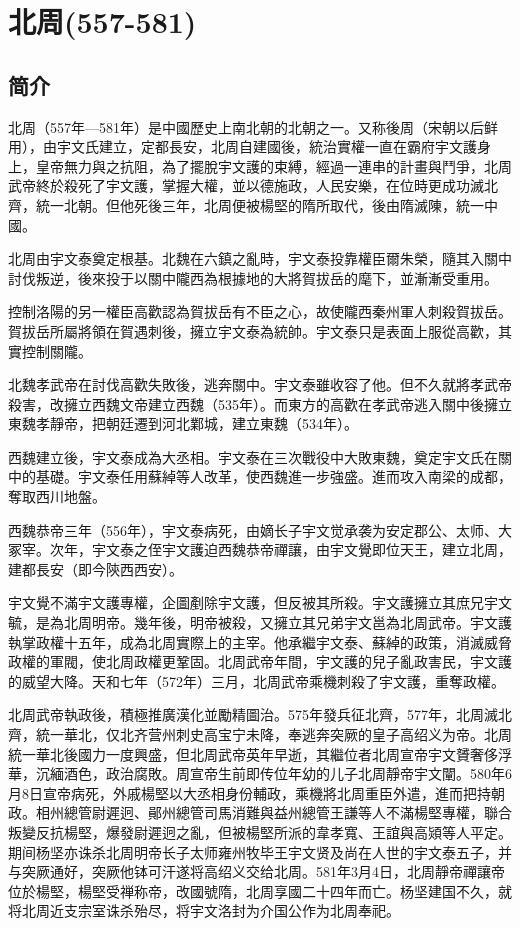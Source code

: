 

\section{北周\tiny(557-581)}

\subsection{简介}

北周（557年—581年）是中國歷史上南北朝的北朝之一。又称後周（宋朝以后鲜用），由宇文氏建立，定都長安，北周自建國後，統治實權一直在霸府宇文護身上，皇帝無力與之抗阻，為了擺脫宇文護的束縛，經過一連串的計畫與鬥爭，北周武帝終於殺死了宇文護，掌握大權，並以德施政，人民安樂，在位時更成功滅北齊，統一北朝。但他死後三年，北周便被楊堅的隋所取代，後由隋滅陳，統一中國。

北周由宇文泰奠定根基。北魏在六鎮之亂時，宇文泰投靠權臣爾朱榮，隨其入關中討伐叛逆，後來投于以關中隴西為根據地的大將賀拔岳的麾下，並漸漸受重用。

控制洛陽的另一權臣高歡認為賀拔岳有不臣之心，故使隴西秦州軍人刺殺賀拔岳。賀拔岳所屬將領在賀遇刺後，擁立宇文泰為統帥。宇文泰只是表面上服從高歡，其實控制關隴。

北魏孝武帝在討伐高歡失敗後，逃奔關中。宇文泰雖收容了他。但不久就將孝武帝殺害，改擁立西魏文帝建立西魏（535年）。而東方的高歡在孝武帝逃入關中後擁立東魏孝靜帝，把朝廷遷到河北鄴城，建立東魏（534年）。

西魏建立後，宇文泰成為大丞相。宇文泰在三次戰役中大敗東魏，奠定宇文氏在關中的基礎。宇文泰任用蘇綽等人改革，使西魏進一步強盛。進而攻入南梁的成都，奪取西川地盤。

西魏恭帝三年（556年），宇文泰病死，由嫡长子宇文觉承袭为安定郡公、太师、大冢宰。次年，宇文泰之侄宇文護迫西魏恭帝禪讓，由宇文覺即位天王，建立北周，建都長安（即今陝西西安）。

宇文覺不滿宇文護專權，企圖剷除宇文護，但反被其所殺。宇文護擁立其庶兄宇文毓，是為北周明帝。幾年後，明帝被殺，又擁立其兄弟宇文邕為北周武帝。宇文護執掌政權十五年，成為北周實際上的主宰。他承繼宇文泰、蘇綽的政策，消滅威脅政權的軍閥，使北周政權更鞏固。北周武帝年間，宇文護的兒子亂政害民，宇文護的威望大降。天和七年（572年）三月，北周武帝乘機刺殺了宇文護，重奪政權。

北周武帝執政後，積極推廣漢化並勵精圖治。575年發兵征北齊，577年，北周滅北齊，統一華北，仅北齐营州刺史高宝宁未降，奉逃奔突厥的皇子高绍义为帝。北周統一華北後國力一度興盛，但北周武帝英年早逝，其繼位者北周宣帝宇文贇奢侈浮華，沉緬酒色，政治腐敗。周宣帝生前即传位年幼的儿子北周靜帝宇文闡。580年6月8日宣帝病死，外戚楊堅以大丞相身份輔政，乘機將北周重臣外遣，進而把持朝政。相州總管尉遲迥、鄖州總管司馬消難與益州總管王謙等人不滿楊堅專權，聯合叛變反抗楊堅，爆發尉遲迥之亂，但被楊堅所派的韋孝寬、王誼與高熲等人平定。期间杨坚亦诛杀北周明帝长子太师雍州牧毕王宇文贤及尚在人世的宇文泰五子，并与突厥通好，突厥他钵可汗遂将高绍义交给北周。581年3月4日，北周靜帝禪讓帝位於楊堅，楊堅受禅称帝，改國號隋，北周享國二十四年而亡。杨坚建国不久，就将北周近支宗室诛杀殆尽，将宇文洛封为介国公作为北周奉祀。


